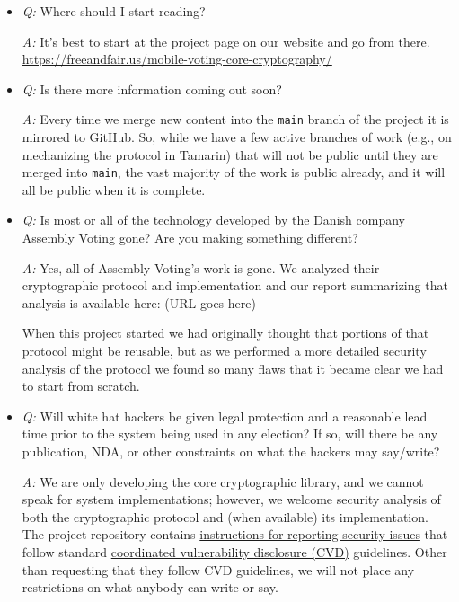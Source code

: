 \documentclass[12pt,letter]{article}
\begin{document}
\begin{itemize}

    \item \emph{Q:} Where should I start reading?

    \emph{A:} It's best to start at the project page on our website and go from there. \\
    \href{https://freeandfair.us/mobile-voting-core-cryptography/}{https://freeandfair.us/mobile-voting-core-cryptography/}

    \item \emph{Q:} Is there more information coming out soon?

    \emph{A:} Every time we merge new content into the \texttt{main} branch of the project it is mirrored to GitHub.  So, while we have a few active branches of work (e.g., on mechanizing the protocol in Tamarin) that will not be public until they are merged into \texttt{main}, the vast majority of the work is public already, and it will all be public when it is complete.

    \item \emph{Q:} Is most or all of the technology developed by the Danish company Assembly Voting gone? Are you making something different?

    \emph{A:} Yes, all of Assembly Voting's work is gone.  We analyzed their cryptographic protocol and implementation and our report summarizing that analysis is available here: (URL goes here)

    When this project started we had originally thought that portions of that protocol might be reusable, but as we performed a more detailed security analysis of the protocol we found so many flaws that it became clear we had to start from scratch.

    \item \emph{Q:} Will white hat hackers be given legal protection and a reasonable lead time prior to the system being used in any election?  If so, will there be any publication, NDA, or other constraints on what the hackers may say/write?

    \emph{A:} We are only developing the core cryptographic library, and we cannot speak for system implementations; however, we welcome security analysis of both the cryptographic protocol and (when available) its implementation. The project repository contains \href{https://github.com/FreeAndFair/MobileVotingCoreCryptography/blob/main/SECURITY.md}{instructions for reporting security issues} that follow standard \href{https://en.wikipedia.org/wiki/Coordinated_vulnerability_disclosure}{coordinated vulnerability disclosure (CVD)} guidelines. Other than requesting that they follow CVD guidelines, we will not place any restrictions on what anybody can write or say.

\end{itemize}
\end{document}
